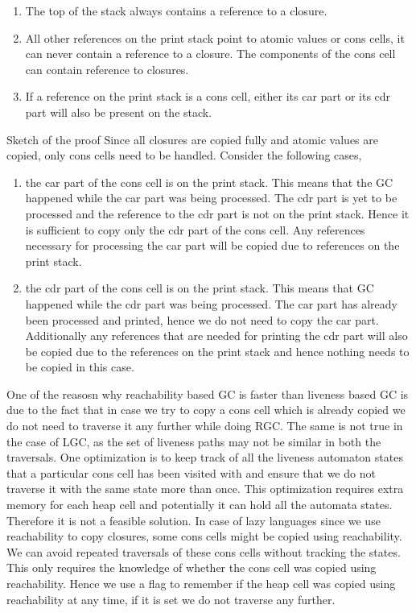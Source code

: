 \documentclass[9pt]{sigplanconf}
\begin{document}
\begin{enumerate}
\begin{enumerate}
\item The top of the stack always contains a reference to a closure.
\item All other references on the print stack point to atomic values or cons cells, it can never contain a
reference to a closure. The components of the cons cell can contain reference to closures.
\item If a reference on the print stack is a cons cell, either its car part or its cdr part will also be 
present on the stack.
\end{enumerate}
Sketch of the proof
Since all closures are copied fully and atomic values are copied, only cons cells need to be handled. 
Consider the following cases,
\begin{enumerate}
\item the car part of the cons  cell is on the print stack. This means
  that the GC happened while the car part was being processed. The cdr
  part is yet to be processed and the reference to the cdr part is not
  on the print stack. Hence it is sufficient to copy only the cdr part
  of the  cons cell. Any  references necessary for processing  the car
  part will be copied due to references on the print stack.
\item the cdr part of the cons  cell is on the print stack. This means
  that GC  happened while the cdr  part was being  processed.  The car
  part has already been processed and printed, hence we do not need to
  copy the car  part. Additionally any references that  are needed for
  printing the cdr  part will also be copied due  to the references on
  the print stack and hence nothing needs to be copied in this case.
\end{enumerate}
One of the  reasosn why reachability based GC  is faster than liveness
based GC is  due to the fact that  in case we try to copy  a cons cell
which is  already copied  we do  not need to  traverse it  any further
while doing RGC. The  same is not true in the case  of LGC, as the set
of  liveness paths  may not  be similar  in both  the  traversals. One
optimization is  to keep  track of all  the liveness  automaton states
that a particular  cons cell has been visited with  and ensure that we
do  not  traverse  it  with  the  same state  more  than  once.   This
optimization requires extra memory  for each heap cell and potentially
it can hold  all the automata states.  Therefore it  is not a feasible
solution. In case of lazy  languages since we use reachability to copy
closures, some cons  cells might be copied using  reachability. We can
avoid  repeated traversals of  these cons  cells without  tracking the
states. This only requires the  knowledge of whether the cons cell was
copied using  reachability.  Hence  we use a  flag to remember  if the
heap cell was  copied using reachability at any time, if  it is set we
do not traverse any further.


\end{enumerate}
\end{document}
